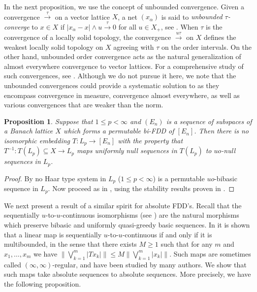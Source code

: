 \documentclass[12pt,leqno]{amsart}
\newtheorem{proposition}[theorem]{Proposition}
\numberwithin{equation}{section}
\theoremstyle{definition}
\begin{document}
In the next proposition, we use the concept of  unbounded convergence. Given a convergence $\xrightarrow{\tau}$ on a vector lattice $X$, a net $(x_\alpha)$ is said to \emph{unbounded $\tau$-converge} to $x\in X$ if $|x_\alpha-x|\wedge u\xrightarrow{\tau}0$ for all $u\in X_+$, see \cite{T1}. When $\tau$ is the convergence of a locally solid topology,  the convergence $\xrightarrow{u\tau}$ on $X$ defines the weakest locally solid topology on $X$  agreeing with $\tau$ on the order intervals. On the other hand, unbounded order convergence acts as the natural generalization of almost everywhere convergence to vector lattices. For a comprehensive study of such convergences, see \cite{DOT17,T2, MR3803666}. Although we  do not pursue it here, we note that the unbounded convergences could provide a systematic solution to \cite[Problem 12.3]{AABW19} as they encompass convergence in measure, convergence almost everywhere, as well as various  convergences that are weaker than the norm.
\begin{proposition}\label{Lp no perm}
Suppose that $1\leq p<\infty$ and $(E_n)$ is a sequence of subspaces of a Banach lattice $X$ which forms a permutable bi-FDD of $[E_n]$. Then there is no isomorphic embedding $T:L_p\to [E_n]$ with the property that $T^{-1}:T(L_p)\subseteq X\to L_p$ maps uniformly null sequences in $T(L_p)$ to $uo$-null sequences in $L_p$.
\end{proposition}
\begin{proof}
By \cite[Corollary 9 and Remark 10, p.~102]{KS89} no Haar type system in $L_p$ ($1\leq p<\infty$) is a permutable $uo$-bibasic sequence in $L_p$. Now proceed as in \cite[Theorem 5.1]{GKP}, using the stability results proven in \cite{TT19}.
\end{proof}
We next present a result of a similar spirit for absolute FDD's.  Recall that the sequentially $u$-to-$u$-continuous isomorphisms (see \cite{TT19}) are the natural morphisms which preserve bibasic and uniformly quasi-greedy basic sequences. In \cite[Proposition 7.10]{OTTT} it is shown that a linear map is sequentially $u$-to-$u$-continuous if and only if it is multibounded, in the sense that there exists $M\geq 1$ such that for any $m$ and $x_1,\dots,x_m$ we have $\|\bigvee_{k=1}^m|Tx_k|\|\leq M\|\bigvee_{k=1}^m|x_k|\|$. Such maps are  sometimes called $(\infty,\infty)$-regular, and have been studied by many authors. 
We show that such maps take absolute sequences to absolute sequences. More precisely, we have the following proposition.
\end{document}
